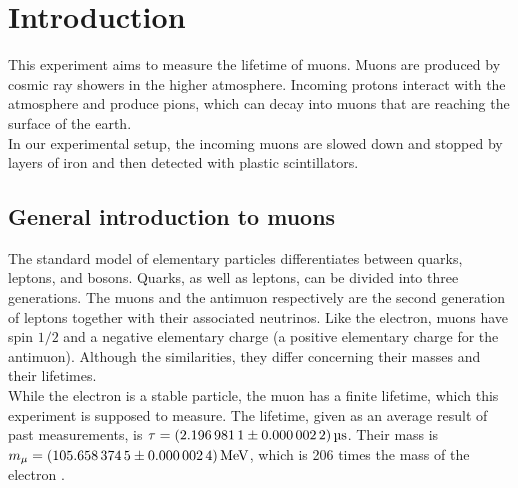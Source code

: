 \chapter{Introduction}
\label{sec:intro}
This experiment aims to measure the lifetime of muons. Muons are produced by cosmic ray showers in the higher atmosphere.
Incoming protons interact with the atmosphere and produce pions, which can decay into muons that are reaching the surface of the earth. \\
In our experimental setup, the incoming muons are slowed down and stopped by layers of iron and then detected with plastic
scintillators. 

\section{General introduction to muons}
The standard model of elementary particles differentiates between quarks, leptons, and bosons.
Quarks, as well as leptons, can be divided into three generations.
The muons and the antimuon respectively are the second generation of leptons together with their associated neutrinos.
Like the electron, muons have spin $1/2$ and a negative elementary charge (a positive elementary charge for the antimuon).
Although the similarities, they differ concerning their masses and their lifetimes. \\
While the electron is a stable particle, the muon has a finite lifetime, which this experiment is supposed to measure. 
The lifetime, given as an average result of past measurements, is $\tau = \SI{2.1969811 \pm 0.0000022}{\micro\second}$.
Their mass is $m_{\mu} = \SI{105.6583745 \pm 0.0000024}{\mega\eV}$, which is 206 times the mass of the electron \cite{pdg}.

